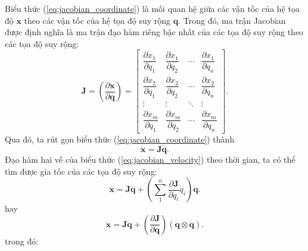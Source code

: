 Biểu thức (\ref{eq:jacobian_coordinate}) là mối quan hệ giữa các vận tốc của hệ tọa độ \(\mathbf{x}\) theo các vận tốc của hệ tọa độ suy rộng \(\mathbf{q}\). Trong đó, ma trận Jacobian được định nghĩa là ma trận đạo hàm riêng bậc nhất của các tọa độ suy rộng theo các tọa độ suy rộng:
\begin{equation}
    \mathbf{J} = 
    \left( \dfrac{\partial \mathbf{x}}{\partial \mathbf{q}}\right)
    = \left[
    \begin{array}{cccc}
        \dfrac{\partial x_1}{\partial q_1} & \dfrac{\partial x_1}{\partial q_2} & \cdots & \dfrac{\partial x_1}{\partial q_n} \\
        \dfrac{\partial x_2}{\partial q_1} & \dfrac{\partial x_2}{\partial q_2} & \cdots & \dfrac{\partial x_2}{\partial q_n} \\
        \vdots & \vdots & \ddots & \vdots \\
        \dfrac{\partial x_m}{\partial q_1} & \dfrac{\partial x_m}{\partial q_2} & \cdots & \dfrac{\partial x_m}{\partial q_n}
    \end{array}
    \right].
\end{equation}
Qua đó, ta rút gọn biểu thức (\ref{eq:jacobian_coordinate}) thành
\begin{equation} \label{eq:jacobian_velocity}
    \mathbf{\dot{x}} = \mathbf{J} \mathbf{\dot{q}}.
\end{equation}
Đạo hàm hai vế của biểu thức (\ref{eq:jacobian_velocity}) theo thời gian, ta có thể tìm được gia tốc của các tọa độ suy rộng:
\begin{equation} \label{eq:jacobian_acceleration}
    \mathbf{\ddot{x}} = \mathbf{J} \mathbf{\ddot{q}} + \left( \sum_{1}^{n} \dfrac{\partial \mathbf{J}}{\partial q_i} \dot{q}_i \right) \mathbf{\dot{q}}.
\end{equation}
hay
\begin{equation}
    \mathbf{\ddot{x}} = \mathbf{J} \mathbf{\ddot{q}} + \left( \dfrac{\partial \mathbf{J}}{\partial \mathbf{q}} \right) \left( \mathbf{\dot{q}} \otimes \mathbf{\dot{q}} \right).
\end{equation}
trong đó:
